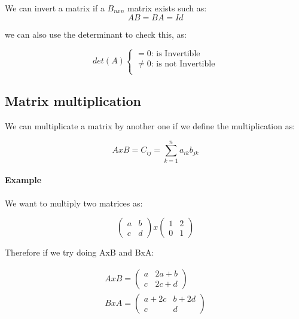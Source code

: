 \documentclass[11pt,fleqn]{book} %
\begin{document}
We can invert a matrix if a $ B_{nxn} $ matrix exists such as:
\begin{equation}
    AB = BA = Id
\end{equation}

we can also use the determinant to check this, as:

\begin{equation}
    det(A) \begin{cases}
        = 0 \text{: is Invertible} \\
        \neq 0 \text{: is not Invertible} \\
    \end{cases}
\end{equation}

\subsection{Matrix multiplication}

We can multiplicate a matrix by another one if we define the multiplication as:

\begin{equation}
    AxB = C_{ij} = \sum_{k = 1}^{n} a_{ik} b_{jk}  
\end{equation}

\paragraph{Example}

We want to multiply two matrices as:

\begin{equation}
    \begin{pmatrix}
        a & b\\
        c & d
    \end{pmatrix}
    x
    \begin{pmatrix}
        1 & 2 \\
        0 & 1
    \end{pmatrix}
\end{equation}

Therefore if we try doing AxB and BxA:

\begin{gather}
    AxB =
    \begin{pmatrix}
        a & 2a + b \\
        c & 2c + d
    \end{pmatrix}\\
    BxA =
    \begin{pmatrix}
        a+2c & b + 2d \\
        c & d
    \end{pmatrix}\\
\end{gather}
\end{document}
